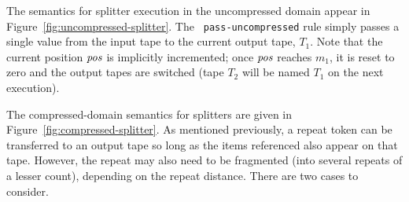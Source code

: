 The semantics for splitter execution in the uncompressed domain appear
in Figure~\ref{fig:uncompressed-splitter}.  The {\tt
  pass-uncompressed} rule simply passes a single value from the input
tape to the current output tape, $T_1$.  Note that the current
position $\mbox{\it pos}$ is implicitly incremented; once $\mbox{\it pos}$ reaches $m_1$,
it is reset to zero and the output tapes are switched (tape $T_2$ will
be named $T_1$ on the next execution).

The compressed-domain semantics for splitters are given in
Figure~\ref{fig:compressed-splitter}.  As mentioned previously, a
repeat token can be transferred to an output tape so long as the items
referenced also appear on that tape.  However, the repeat may also
need to be fragmented (into several repeats of a lesser count),
depending on the repeat distance.  There are two cases to consider.


